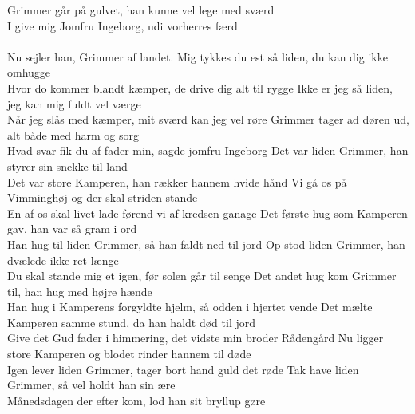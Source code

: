 \begin{flushleft}
 Grimmer går på gulvet, han kunne vel lege med sværd\\
I give mig Jomfru Ingeborg, udi vorherres færd\\
\hops
\hspace{0.9cm}\\
\hspace{0.9cm}Nu sejler han, Grimmer af landet.
\hops
{}Mig tykkes du est så liden, du kan dig ikke omhugge\\
Hvor do kommer blandt kæmper, de drive dig alt til rygge
\hops
{}Ikke er jeg så liden, jeg kan mig fuldt vel værge\\
Når jeg slås med kæmper, mit sværd kan jeg vel røre 
\hops
{}Grimmer tager ad døren ud, alt både med harm og sorg\\
Hvad svar fik du af fader min, sagde jomfru Ingeborg
\hops
{}Det var liden Grimmer, han styrer sin snekke til land\\
Det var store Kamperen, han rækker hannem hvide hånd
\hops
{}Vi gå os på Vimminghøj og der skal striden stande\\
En af os skal livet lade førend vi af kredsen ganage
\hops
{}Det første hug som Kamperen gav, han var så gram i ord\\
Han hug til liden Grimmer, så han faldt ned til jord
\hops
{}Op stod liden Grimmer, han dvælede ikke ret længe\\
Du skal stande mig et igen, før solen går til senge
\hops
{}Det andet hug kom Grimmer til, han hug med højre hænde\\
Han hug i Kamperens forgyldte hjelm, så odden i hjertet vende
\hops
{}Det mælte Kamperen samme stund, da han haldt død til jord\\
Give det Gud fader i himmering, det vidste min broder Rådengård
\hops
{}Nu ligger store Kamperen og blodet rinder hannem til døde\\
Igen lever liden Grimmer, tager bort hand guld det røde
\hops
{}Tak have liden Grimmer, så vel holdt han sin ære\\
Månedsdagen der efter kom, lod han sit bryllup gøre
\end{flushleft}
\newpage

